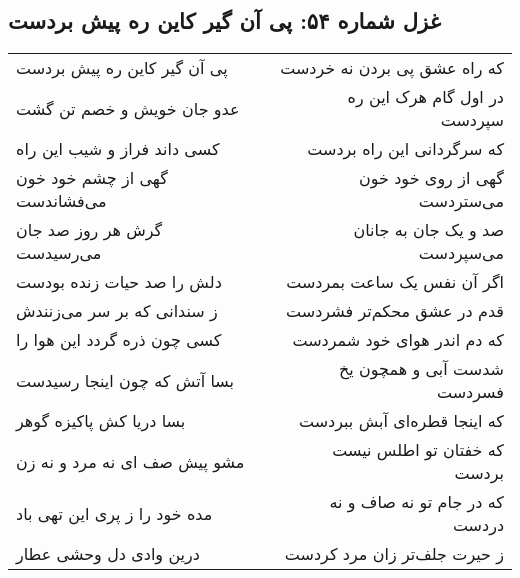 \begin{center}
\section*{غزل شماره ۵۴: پی آن گیر کاین ره پیش بردست}
\label{sec:054}
\begin{longtable}{l p{0.5cm} r}
پی آن گیر کاین ره پیش بردست
&&
که راه عشق پی بردن نه خردست
\\
عدو جان خویش و خصم تن گشت
&&
در اول گام هرک این ره سپردست
\\
کسی داند فراز و شیب این راه
&&
که سرگردانی این راه بردست
\\
گهی از چشم خود خون می‌فشاندست
&&
گهی از روی خود خون می‌ستردست
\\
گرش هر روز صد جان می‌رسیدست
&&
صد و یک جان به جانان می‌سپردست
\\
دلش را صد حیات زنده بودست
&&
اگر آن نفس یک ساعت بمردست
\\
ز سندانی که بر سر می‌زنندش
&&
قدم در عشق محکم‌تر فشردست
\\
کسی چون ذره گردد این هوا را
&&
که دم اندر هوای خود شمردست
\\
بسا آتش که چون اینجا رسیدست
&&
شدست آبی و همچون یخ فسردست
\\
بسا دریا کش پاکیزه گوهر
&&
که اینجا قطره‌ای آبش ببردست
\\
مشو پیش صف ای نه مرد و نه زن
&&
که خفتان تو اطلس نیست بردست
\\
مده خود را ز پری این تهی باد
&&
که در جام تو نه صاف و نه دردست
\\
درین وادی دل وحشی عطار
&&
ز حیرت جلف‌تر زان مرد کردست
\\
\end{longtable}
\end{center}
